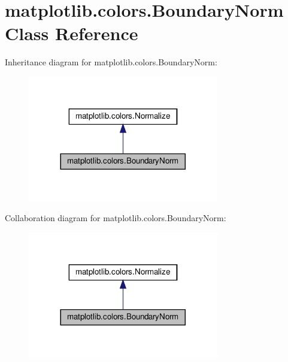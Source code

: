 \hypertarget{classmatplotlib_1_1colors_1_1BoundaryNorm}{}\section{matplotlib.\+colors.\+Boundary\+Norm Class Reference}
\label{classmatplotlib_1_1colors_1_1BoundaryNorm}


Inheritance diagram for matplotlib.\+colors.\+Boundary\+Norm\+:
\nopagebreak
\begin{figure}[H]
\begin{center}
\leavevmode
\includegraphics[width=236pt]{classmatplotlib_1_1colors_1_1BoundaryNorm__inherit__graph}
\end{center}
\end{figure}


Collaboration diagram for matplotlib.\+colors.\+Boundary\+Norm\+:
\nopagebreak
\begin{figure}[H]
\begin{center}
\leavevmode
\includegraphics[width=236pt]{classmatplotlib_1_1colors_1_1BoundaryNorm__coll__graph}
\end{center}
\end{figure}
